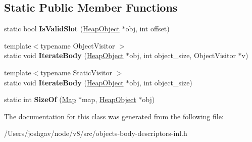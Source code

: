 \subsection*{Static Public Member Functions}
\begin{DoxyCompactItemize}
\item 
static bool {\bfseries Is\+Valid\+Slot} (\hyperlink{classv8_1_1internal_1_1_heap_object}{Heap\+Object} $\ast$obj, int offset)\hypertarget{classv8_1_1internal_1_1_bytecode_array_1_1_body_descriptor_a08fbf74cbb0af3b470ff94177cedbb58}{}\label{classv8_1_1internal_1_1_bytecode_array_1_1_body_descriptor_a08fbf74cbb0af3b470ff94177cedbb58}

\item 
{\footnotesize template$<$typename Object\+Visitor $>$ }\\static void {\bfseries Iterate\+Body} (\hyperlink{classv8_1_1internal_1_1_heap_object}{Heap\+Object} $\ast$obj, int object\+\_\+size, Object\+Visitor $\ast$v)\hypertarget{classv8_1_1internal_1_1_bytecode_array_1_1_body_descriptor_a915b493f8ab8cb3c44cfbe4b81409ce9}{}\label{classv8_1_1internal_1_1_bytecode_array_1_1_body_descriptor_a915b493f8ab8cb3c44cfbe4b81409ce9}

\item 
{\footnotesize template$<$typename Static\+Visitor $>$ }\\static void {\bfseries Iterate\+Body} (\hyperlink{classv8_1_1internal_1_1_heap_object}{Heap\+Object} $\ast$obj, int object\+\_\+size)\hypertarget{classv8_1_1internal_1_1_bytecode_array_1_1_body_descriptor_a4155f6d0fd926124b1e10d7f2490ae42}{}\label{classv8_1_1internal_1_1_bytecode_array_1_1_body_descriptor_a4155f6d0fd926124b1e10d7f2490ae42}

\item 
static int {\bfseries Size\+Of} (\hyperlink{classv8_1_1internal_1_1_map}{Map} $\ast$map, \hyperlink{classv8_1_1internal_1_1_heap_object}{Heap\+Object} $\ast$obj)\hypertarget{classv8_1_1internal_1_1_bytecode_array_1_1_body_descriptor_a6cb7723a5f1d77c62e4e97f5211b96b3}{}\label{classv8_1_1internal_1_1_bytecode_array_1_1_body_descriptor_a6cb7723a5f1d77c62e4e97f5211b96b3}

\end{DoxyCompactItemize}


The documentation for this class was generated from the following file\+:\begin{DoxyCompactItemize}
\item 
/\+Users/joshgav/node/v8/src/objects-\/body-\/descriptors-\/inl.\+h\end{DoxyCompactItemize}
